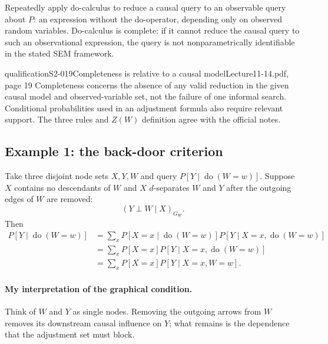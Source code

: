 Repeatedly apply do-calculus to reduce a causal query to an observable query about $P$: an expression without the do-operator, depending only on observed random variables. Do-calculus is complete: if it cannot reduce the causal query to such an observational expression, the query is not nonparametrically identifiable in the stated SEM framework.

\begin{reviewnote}{qualification}{S2-019}{Completeness is relative to a causal model}{Lecture11-14.pdf, page 19}
Completeness concerns the absence of any valid reduction in the given causal model and observed-variable set, not the failure of one informal search. Conditional probabilities used in an adjustment formula also require relevant support. The three rules and $Z(W)$ definition agree with the official notes.
\end{reviewnote}


\subsection{Example 1: the back-door criterion}
Take three disjoint node sets $X,Y,W$ and query $P[Y\mid\operatorname{do}(W=w)]$. Suppose $X$ contains no descendants of $W$ and $X$ $d$-separates $W$ and $Y$ after the outgoing edges of $W$ are removed:
\[
 (Y\perp W\mid X)_{G_{\underline W}}.\tag{13.8}
\]
Then
\begin{align*}
 P[Y\mid\operatorname{do}(W=w)]
 &=\sum_xP[X=x\mid\operatorname{do}(W=w)]
 P[Y\mid X=x,\operatorname{do}(W=w)]\\
 &=\sum_xP[X=x]P[Y\mid X=x,\operatorname{do}(W=w)]\\
 &=\sum_xP[X=x]P[Y\mid X=x,W=w].\tag{13.9}
\end{align*}

\paragraph{My interpretation of the graphical condition.}
Think of $W$ and $Y$ as single nodes. Removing the outgoing arrows from $W$ removes its downstream causal influence on $Y$; what remains is the dependence that the adjustment set must block. 

